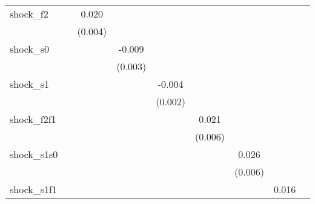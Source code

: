 {\begin{tabular}{l*{8}{c}}
\addlinespace
shock\_f2    &                     &       0.020\sym{***}&                     &                     &                     &                     &                     &                     \\
            &                     &     (0.004)         &                     &                     &                     &                     &                     &                     \\
\addlinespace
shock\_s0    &                     &                     &      -0.009\sym{***}&                     &                     &                     &                     &                     \\
            &                     &                     &     (0.003)         &                     &                     &                     &                     &                     \\
\addlinespace
shock\_s1    &                     &                     &                     &      -0.004\sym{**} &                     &                     &                     &                     \\
            &                     &                     &                     &     (0.002)         &                     &                     &                     &                     \\
\addlinespace
shock\_f2f1  &                     &                     &                     &                     &       0.021\sym{***}&                     &                     &                     \\
            &                     &                     &                     &                     &     (0.006)         &                     &                     &                     \\
\addlinespace
shock\_s1s0  &                     &                     &                     &                     &                     &       0.026\sym{***}&                     &                     \\
            &                     &                     &                     &                     &                     &     (0.006)         &                     &                     \\
\addlinespace
shock\_s1f1  &                     &                     &                     &                     &                     &                     &       0.016\sym{**} &                     \\

\end{tabular}}

